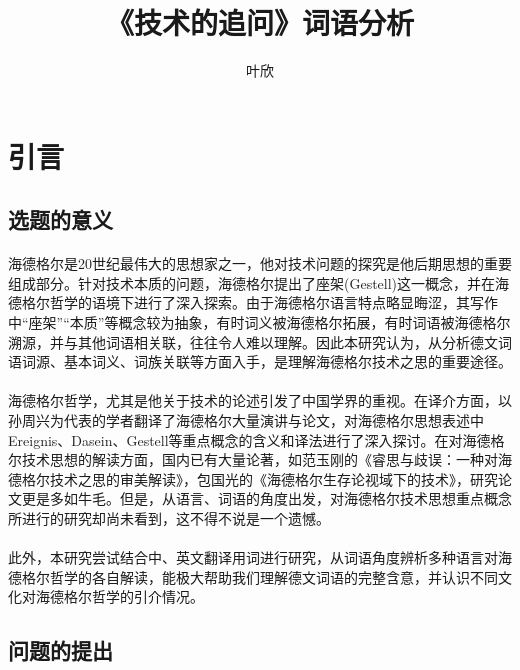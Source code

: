 \documentclass{article}
\author{叶欣}
\title{《技术的追问》词语分析}
\begin{document}
   
\maketitle   



\begin{abstract}

\end{abstract}



\tableofcontents

\section{引言} 

	\subsection{选题的意义} 
		\paragraph{}
海德格尔是20世纪最伟大的思想家之一，他对技术问题的探究是他后期思想的重要组成部分。针对技术本质的问题，海德格尔提出了座架(Gestell)这一概念，并在海德格尔哲学的语境下进行了深入探索。由于海德格尔语言特点略显晦涩，其写作中“座架”“本质”等概念较为抽象，有时词义被海德格尔拓展，有时词语被海德格尔溯源，并与其他词语相关联，往往令人难以理解。因此本研究认为，从分析德文词语词源、基本词义、词族关联等方面入手，是理解海德格尔技术之思的重要途径。
		\paragraph{}
海德格尔哲学，尤其是他关于技术的论述引发了中国学界的重视。在译介方面，以孙周兴为代表的学者翻译了海德格尔大量演讲与论文，对海德格尔思想表述中Ereignis、Dasein、Gestell等重点概念的含义和译法进行了深入探讨。在对海德格尔技术思想的解读方面，国内已有大量论著，如范玉刚的《睿思与歧误：一种对海德格尔技术之思的审美解读》，包国光的《海德格尔生存论视域下的技术》，研究论文更是多如牛毛。但是，从语言、词语的角度出发，对海德格尔技术思想重点概念所进行的研究却尚未看到，这不得不说是一个遗憾。
		\paragraph{}
此外，本研究尝试结合中、英文翻译用词进行研究，从词语角度辨析多种语言对海德格尔哲学的各自解读，能极大帮助我们理解德文词语的完整含意，并认识不同文化对海德格尔哲学的引介情况。
	\subsection{问题的提出}
\end{document}
